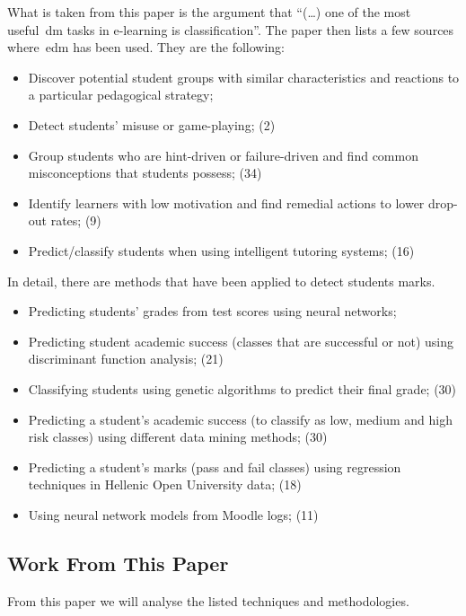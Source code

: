What is taken from this paper is the argument that ``(\dots) one of the most
useful~\gls{dm} tasks in e-learning is classification''. The paper then lists a
few sources where~\gls{edm} has been used. They are the following:

\begin{itemize}
    \item Discover potential student groups with similar characteristics and
        reactions to a particular pedagogical strategy;~\cite{ind_002}
    \item Detect students' misuse or game-playing; (2)
    \item Group students who are hint-driven or failure-driven and find common
        misconceptions that students possess; (34)
    \item Identify learners with low motivation and find remedial actions to
        lower drop-out rates; (9)
    \item Predict/classify students when using intelligent tutoring systems;
        (16)
\end{itemize}

In detail, there are methods that have been applied to detect students marks.

\begin{itemize}
    \item Predicting students' grades from test scores using neural
        networks;~\cite{ind_003}
    \item Predicting student academic success (classes that are successful or
        not) using discriminant function analysis; (21)
    \item Classifying students using genetic algorithms to predict their final
        grade; (30)
    \item Predicting a student's academic success (to classify as low, medium
        and high risk classes) using different data mining methods; (30)
    \item Predicting a student’s marks (pass and fail classes) using regression
        techniques in Hellenic Open University data; (18)
    \item Using neural network models from Moodle logs; (11)
\end{itemize}

\subsection{Work From This Paper}

From this paper we will analyse the listed techniques and methodologies.

